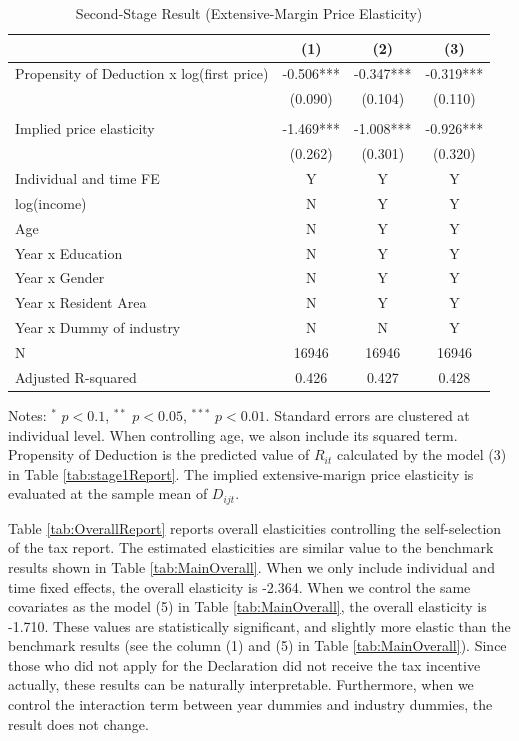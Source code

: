 \documentclass[
  11pt,
  a4paper,
]{article}
\begin{document}
\begin{table}

\caption{\label{tab:ExtensiveReport}Second-Stage Result (Extensive-Margin Price Elasticity)}
\centering
\fontsize{9}{11}\selectfont
\begin{threeparttable}
\begin{tabular}[t]{lccc}
\toprule
 & (1) & (2) & (3)\\
\midrule
Propensity of Deduction x log(first price) & -0.506*** & -0.347*** & -0.319***\\
 & (0.090) & (0.104) & (0.110)\\
 &  &  & \\
Implied price elasticity & -1.469*** & -1.008*** & -0.926***\\
 & (0.262) & (0.301) & (0.320)\\
Individual and time FE & Y & Y & Y\\
log(income) & N & Y & Y\\
Age & N & Y & Y\\
Year x Education & N & Y & Y\\
Year x Gender & N & Y & Y\\
Year x Resident Area & N & Y & Y\\
Year x Dummy of industry & N & N & Y\\
N & 16946 & 16946 & 16946\\
Adjusted R-squared & 0.426 & 0.427 & 0.428\\
\bottomrule
\end{tabular}
\begin{tablenotes}
\item Notes: $^{*}$ $p < 0.1$, $^{**}$ $p < 0.05$, $^{***}$ $p < 0.01$. Standard errors are clustered at individual level. When controlling age, we alson include its squared term. Propensity of Deduction is the predicted value of $R_{it}$ calculated by the model (3) in Table \ref{tab:stage1Report}. The implied extensive-marign price elasticity is evaluated at the sample mean of $D_{ijt}$.
\end{tablenotes}
\end{threeparttable}
\end{table}

Table \ref{tab:OverallReport} reports overall elasticities controlling the self-selection of the tax report.
The estimated elasticities are similar value to the benchmark results shown in Table \ref{tab:MainOverall}.
When we only include individual and time fixed effects, the overall elasticity is -2.364.
When we control the same covariates as the model (5) in Table \ref{tab:MainOverall},
the overall elasticity is -1.710.
These values are statistically significant,
and slightly more elastic than the benchmark results
(see the column (1) and (5) in Table \ref{tab:MainOverall}).
Since those who did not apply for the Declaration did not receive the tax incentive actually,
these results can be naturally interpretable.
Furthermore, when we control the interaction term between year dummies and industry dummies,
the result does not change.
\end{document}
